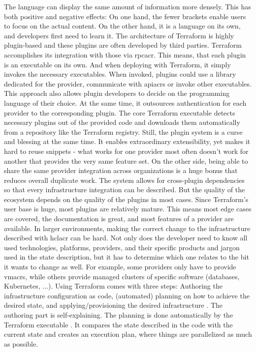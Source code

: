 The language can display the same amount of information more densely. This has both positive and negative effects: On one hand, the fewer brackets enable users to focus on the actual content. On the other hand, it is a language on its own, and developers first need to learn it.
\newline
The architecture of Terraform is highly plugin-based and these plugins are often developed by third parties. Terraform accomplishes its integration with those via \gls{rpcacr}. This means, that each plugin is an executable on its own. And when deploying with Terraform, it simply invokes the necessary executables. When invoked, plugins could use a library dedicated for the provider, communicate with \gls{apiacr}s or invoke other executables. This approach also allows plugin developers to decide on the programming language of their choice. At the same time, it outsources authentication for each provider to the corresponding plugin. The core Terraform executable detects necessary plugins out of the provided code and downloads them automatically from a repository like the Terraform registry.
\newline
Still, the plugin system is a curse and blessing at the same time. It enables extraordinary extensibility, yet makes it hard to reuse snippets - what works for one provider most often doesn't work for another that provides the very same feature set. On the other side, being able to share the same provider integration across organizations is a huge bonus that reduces overall duplicate work. The system allows for cross-plugin dependencies so that every infrastructure integration can be described. But the quality of the ecosystem depends on the quality of the plugins in most cases. Since Terraform's user base is huge, most plugins are relatively mature. This means most edge cases are covered, the documentation is great, and most features of a provider are available.
\newline
In larger environments, making the correct change to the infrastructure described with \gls{hclacr} can be hard. Not only does the developer need to know all used technologies, platforms, providers, and their specific products and jargon used in the state description, but it has to determine which one relates to the bit it wants to change as well. For example, some providers only have to provide \gls{vmacr}s, while others provide managed clusters of specific software (databases, Kubernetes, ...).
\newline
Using Terraform comes with three steps: Authoring the infrastructure configuration as code, (automated) planning on how to achieve the desired state, and applying/provisioning the desired infrastructure \cite{terraform_workflow}. The authoring part is self-explaining. The planning is done automatically by the Terraform executable \cite{terraform_workflow}. It compares the state described in the code with the current state and creates an execution plan, where things are parallelized as much as possible.
